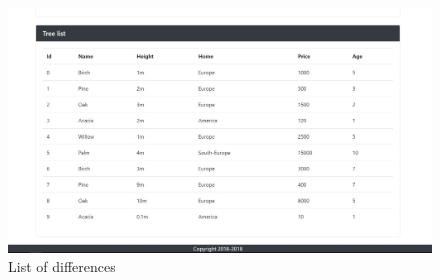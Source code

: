 \documentclass[]{article}
\begin{document}
\begin{figure}[h]
    \centering
    \includegraphics[width=\textwidth]{qa3.JPG}
    \caption{List of differences}
\end{figure}
\end{document}
